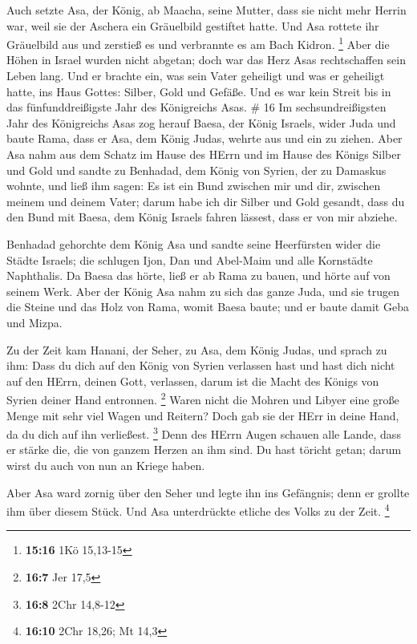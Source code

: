  Auch setzte Asa, der König, ab Maacha, seine Mutter, dass
sie nicht mehr Herrin war, weil sie der Aschera ein Gräuelbild gestiftet
hatte. Und Asa rottete ihr Gräuelbild aus und zerstieß es und verbrannte
es am Bach Kidron. \footnote{\textbf{15:16} 1Kö 15,13-15} 
Aber die Höhen in Israel wurden nicht abgetan; doch war das Herz Asas
rechtschaffen sein Leben lang.  Und er brachte ein, was
sein Vater geheiligt und was er geheiligt hatte, ins Haus Gottes:
Silber, Gold und Gefäße.  Und es war kein Streit bis in das
fünfunddreißigste Jahr des Königreichs Asas. \# 16  Im
sechsundreißigsten Jahr des Königreichs Asas zog herauf Baesa, der König
Israels, wider Juda und baute Rama, dass er Asa, dem König Judas, wehrte
aus und ein zu ziehen.  Aber Asa nahm aus dem Schatz im
Hause des HErrn und im Hause des Königs Silber und Gold und sandte zu
Benhadad, dem König von Syrien, der zu Damaskus wohnte, und ließ ihm
sagen:  Es ist ein Bund zwischen mir und dir, zwischen
meinem und deinem Vater; darum habe ich dir Silber und Gold gesandt,
dass du den Bund mit Baesa, dem König Israels fahren lässest, dass er
von mir abziehe.

 Benhadad gehorchte dem König Asa und sandte seine
Heerfürsten wider die Städte Israels; die schlugen Ijon, Dan und
Abel-Maim und alle Kornstädte Naphthalis.  Da Baesa das
hörte, ließ er ab Rama zu bauen, und hörte auf von seinem Werk.
 Aber der König Asa nahm zu sich das ganze Juda, und sie
trugen die Steine und das Holz von Rama, womit Baesa baute; und er baute
damit Geba und Mizpa.

 Zu der Zeit kam Hanani, der Seher, zu Asa, dem König Judas,
und sprach zu ihm: Dass du dich auf den König von Syrien verlassen hast
und hast dich nicht auf den HErrn, deinen Gott, verlassen, darum ist die
Macht des Königs von Syrien deiner Hand entronnen. \footnote{\textbf{16:7}
  Jer 17,5}  Waren nicht die Mohren und Libyer eine große
Menge mit sehr viel Wagen und Reitern? Doch gab sie der HErr in deine
Hand, da du dich auf ihn verließest. \footnote{\textbf{16:8} 2Chr
  14,8-12}  Denn des HErrn Augen schauen alle Lande, dass er
stärke die, die von ganzem Herzen an ihm sind. Du hast töricht getan;
darum wirst du auch von nun an Kriege haben.

 Aber Asa ward zornig über den Seher und legte ihn ins
Gefängnis; denn er grollte ihm über diesem Stück. Und Asa unterdrückte
etliche des Volks zu der Zeit. \footnote{\textbf{16:10} 2Chr 18,26; Mt
  14,3}

